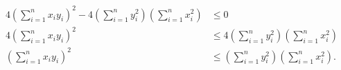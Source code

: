 \documentclass[a4paper, 12pt]{article}
\begin{document}
\begin{parts}
\begin{solution}
\begin{align*}
            4 \left( \sum_{i = 1}^{n} x_i y_i \right)^2 - 
            4 \left( \sum_{i = 1}^{n} y_i ^2 \right) \left( \sum_{i = 1}^{n} x_i ^2
            \right) &\leq 0 \\
            4 \left( \sum_{i = 1}^{n} x_i y_i \right)^2 &\leq
            4 \left( \sum_{i = 1}^{n} y_i ^2 \right) \left( \sum_{i = 1}^{n} x_i ^2
            \right) \\
            \left( \sum_{i = 1}^{n} x_i y_i \right)^2 &\leq \left( \sum_{i = 1}^{n} y_i ^2
                \right) \left( \sum_{i = 1}^{n} x_i ^2
            \right). \\
            \end{align*}

        \end{solution} 

    \end{parts}

    
\end{document}

